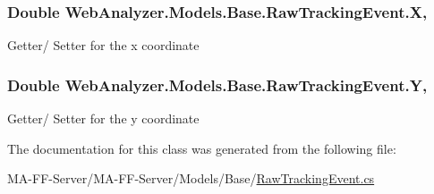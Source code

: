 \hypertarget{class_web_analyzer_1_1_models_1_1_base_1_1_raw_tracking_event_ab5a8776cb0eb8f3d4cc89a25f3a16495}{}
\subsubsection[{X}]{\setlength{\rightskip}{0pt plus 5cm}Double Web\+Analyzer.\+Models.\+Base.\+Raw\+Tracking\+Event.\+X\hspace{0.3cm}{\ttfamily [get]}, {\ttfamily [set]}}\label{class_web_analyzer_1_1_models_1_1_base_1_1_raw_tracking_event_ab5a8776cb0eb8f3d4cc89a25f3a16495}


Getter/ Setter for the x coordinate 

\hypertarget{class_web_analyzer_1_1_models_1_1_base_1_1_raw_tracking_event_afda6b7de37da6ad8950ecf5608e25dab}{}
\subsubsection[{Y}]{\setlength{\rightskip}{0pt plus 5cm}Double Web\+Analyzer.\+Models.\+Base.\+Raw\+Tracking\+Event.\+Y\hspace{0.3cm}{\ttfamily [get]}, {\ttfamily [set]}}\label{class_web_analyzer_1_1_models_1_1_base_1_1_raw_tracking_event_afda6b7de37da6ad8950ecf5608e25dab}


Getter/ Setter for the y coordinate 



The documentation for this class was generated from the following file\+:\begin{DoxyCompactItemize}
\item 
M\+A-\/\+F\+F-\/\+Server/\+M\+A-\/\+F\+F-\/\+Server/\+Models/\+Base/\hyperlink{_raw_tracking_event_8cs}{Raw\+Tracking\+Event.\+cs}\end{DoxyCompactItemize}
